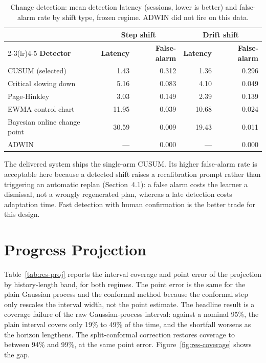 \begin{table}[htbp]
\centering
\footnotesize
\caption{Change detection: mean detection latency (sessions, lower is better) and false-alarm rate by shift type, frozen regime. ADWIN did not fire on this data.}
\label{tab:res-det}
\begin{tabular}{l r r r r}
\toprule
& \multicolumn{2}{c}{\textbf{Step shift}} & \multicolumn{2}{c}{\textbf{Drift shift}} \\
\cmidrule(lr){2-3}\cmidrule(lr){4-5}
\textbf{Detector} & \textbf{Latency} & \textbf{False-alarm} & \textbf{Latency} & \textbf{False-alarm} \\
\midrule
CUSUM (selected) & 1.43 & 0.312 & 1.36 & 0.296 \\
Critical slowing down & 5.16 & 0.083 & 4.10 & 0.049 \\
Page-Hinkley & 3.03 & 0.149 & 2.39 & 0.139 \\
EWMA control chart & 11.95 & 0.039 & 10.68 & 0.024 \\
Bayesian online change point & 30.59 & 0.009 & 19.43 & 0.011 \\
ADWIN & --- & 0.000 & --- & 0.000 \\
\bottomrule
\end{tabular}
\end{table}

The delivered system ships the single-arm CUSUM. Its higher false-alarm rate is acceptable here because a detected shift raises a recalibration prompt rather than triggering an automatic replan (Section~4.1): a false alarm costs the learner a dismissal, not a wrongly regenerated plan, whereas a late detection costs adaptation time. Fast detection with human confirmation is the better trade for this design.

\section{Progress Projection}
Table~\ref{tab:res-proj} reports the interval coverage and point error of the projection by history-length band, for both regimes. The point error is the same for the plain Gaussian process and the conformal method because the conformal step only rescales the interval width, not the point estimate. The headline result is a coverage failure of the raw Gaussian-process interval: against a nominal 95\%, the plain interval covers only 19\% to 49\% of the time, and the shortfall worsens as the horizon lengthens. The split-conformal correction restores coverage to between 94\% and 99\%, at the same point error. Figure~\ref{fig:res-coverage} shows the gap.

